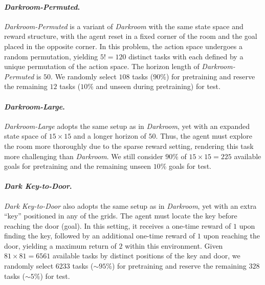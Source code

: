 \documentclass{article}
\begin{document}
\paragraph{\textit{Darkroom-Permuted}.}
%
\textit{Darkroom-Permuted} is a variant of \textit{Darkroom} with the same state space and reward structure, with the agent reset in a fixed corner of the room and the goal placed in the opposite corner. In this problem, the action space undergoes a random permutation, yielding $5! = 120$ distinct tasks with each defined by a unique permutation of the action space. The horizon length of \textit{Darkroom-Permuted} is $50$. We randomly select $108$ tasks ($90\%$) for pretraining and reserve the remaining $12$ tasks ($10\%$ and unseen during pretraining) for test.



\paragraph{\textit{Darkroom-Large}.}
%
\textit{Darkroom-Large} adopts the same setup as in \textit{Darkroom}, yet with an expanded state space of $15 \times 15$ and a longer horizon of $50$. Thus, the agent must explore the room more thoroughly due to the sparse reward setting, rendering this task more challenging than \textit{Darkroom}. We still consider $90\%$ of $15 \times 15 = 225$ available goals for pretraining and the remaining unseen $10\%$ goals for test.


\paragraph{\textit{Dark Key-to-Door}.}
%
\textit{Dark Key-to-Door} also adopts the same setup as in \textit{Darkroom}, yet with an extra ``key'' positioned in any of  the grids. The agent must locate the key before reaching the door (goal). In this setting, it receives a one-time reward of $1$ upon finding the key, followed by an additional one-time reward of $1$ upon reaching the door, yielding a maximum return of $2$ within this environment.
%
Given $81 \times 81 = 6561$ available tasks by distinct positions of the key and door, we randomly select $6233$ tasks ($\sim 95\%$) for pretraining and reserve the remaining $328$ tasks ($\sim 5\%$) for test.
\end{document}
